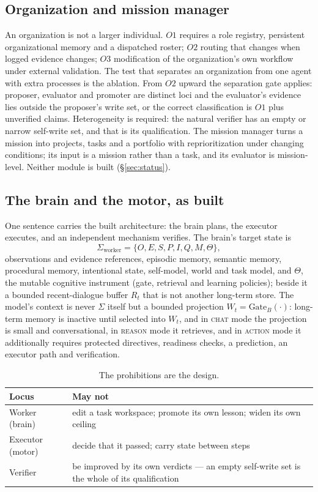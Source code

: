 \documentclass[11pt]{article}
\theoremstyle{definition}
\begin{document}
\subsection{Organization and mission manager}

An organization is not a larger individual. $O1$ requires a role registry, persistent organizational memory and a dispatched roster; $O2$ routing that changes when logged evidence changes; $O3$ modification of the organization's own workflow under external validation. The test that separates an organization from one agent with extra processes is the ablation. From $O2$ upward the separation gate applies: proposer, evaluator and promoter are distinct loci and the evaluator's evidence lies outside the proposer's write set, or the correct classification is $O1$ plus unverified claims. Heterogeneity is required: the natural verifier has an empty or narrow self-write set, and that is its qualification. The mission manager turns a mission into projects, tasks and a portfolio with reprioritization under changing conditions; its input is a mission rather than a task, and its evaluator is mission-level. Neither module is built (\S\ref{sec:status}).

\subsection{The brain and the motor, as built}\label{sec:brainmotor}

One sentence carries the built architecture: the brain plans, the executor executes, and an independent mechanism verifies. The brain's target state is
\[
\Sigma_{\text{worker}} = \{O, E, S, P, I, Q, M, \Theta\},
\]
observations and evidence references, episodic memory, semantic memory, procedural memory, intentional state, self-model, world and task model, and $\Theta$, the mutable cognitive instrument (gate, retrieval and learning policies); beside it a bounded recent-dialogue buffer $R_t$ that is not another long-term store. The model's context is never $\Sigma$ itself but a bounded projection $W_t = \text{Gate}_B(\cdot)$: long-term memory is inactive until selected into $W_t$, and in \textsc{chat} mode the projection is small and conversational, in \textsc{reason} mode it retrieves, and in \textsc{action} mode it additionally requires protected directives, readiness checks, a prediction, an executor path and verification.

\begin{table}[!htbp]
\centering\small
\begin{tabularx}{\textwidth}{@{}lY@{}}
\toprule
Locus & May not \\
\midrule
Worker (brain) & edit a task workspace; promote its own lesson; widen its own ceiling \\
Executor (motor) & decide that it passed; carry state between steps \\
Verifier & be improved by its own verdicts --- an empty self-write set is the whole of its qualification \\
\bottomrule
\end{tabularx}
\caption{The prohibitions are the design.}
\label{tab:prohibit}
\end{table}
\end{document}
